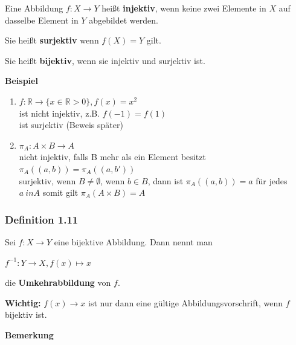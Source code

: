 \documentclass{scrartcl}
\begin{document}
Eine Abbildung $f:X \to Y$ heißt \textbf{injektiv}, wenn keine zwei Elemente in $X$ auf dasselbe Element in $Y$ abgebildet werden.

Sie heißt \textbf{surjektiv} wenn $f(X)=Y$ gilt.

Sie heißt \textbf{bijektiv}, wenn sie injektiv und surjektiv ist. 

\textbf{Beispiel}

\begin{enumerate}
  \item $f: \mathbb{R} \to \{x \in \mathbb{R}>0\}, f(x)=x^2$ \\
    ist nicht injektiv, z.B. $f(-1)=f(1)$ \\
    ist surjektiv (Beweis später)
  \item $\pi_A : A \times B \to A$ \\
    nicht injektiv, falls B mehr als ein Element besitzt $\pi_A((a,b))=\pi_A((a,b'))$ \\
    surjektiv, wenn $B \neq \emptyset$, wenn $b \in B$, dann ist $\pi_A((a,b))=a$ für jedes $a \ in A$ somit gilt $\pi_A(A \times B)=A$
\end{enumerate}

\subsubsection{Definition 1.11}

Sei $f: X \to Y$ eine bijektive Abbildung. Dann nennt man

$f^{-1}:Y \to X,f(x) \mapsto x$

die \textbf{Umkehrabbildung} von $f$.

\textbf{Wichtig:} $f(x) \to x$ ist nur dann eine gültige Abbildungsvorschrift, wenn $f$ bijektiv ist.    

\textbf{Bemerkung}
\end{document}
